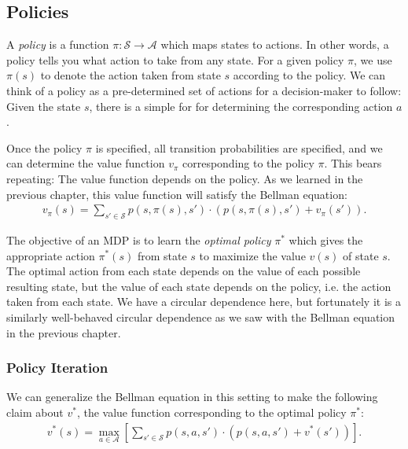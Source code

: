 \documentclass{article}
\begin{document}
    \subsection{\sc Policies}

      A {\it policy} is a function $\pi : \mathcal{S} \rightarrow \mathcal{A}$ which maps states to actions. In other words, a policy tells you what action to take from any state. For a given policy $\pi$, we use $\pi(s)$ to denote the action taken from state $s$ according to the policy. We can think of a policy as a pre-determined set of actions for a decision-maker to follow: Given the state $s$, there is a simple for for determining the corresponding action $a$.

      Once the policy $\pi$ is specified, all transition probabilities are specified, and we can determine the value function $v_\pi$ corresponding to the policy $\pi$. This bears repeating: The value function depends on the policy. As we learned in the previous chapter, this value function will satisfy the Bellman equation:
      \begin{align*}
        v_\pi(s) = \sum_{s' \in \mathcal{S}} p(s, \pi(s), s') \cdot (p(s, \pi(s), s') + v_\pi(s')).
      \end{align*}
      
      The objective of an MDP is to learn the {\it optimal policy} $\pi^*$ which gives the appropriate action $\pi^*(s)$ from state $s$ to maximize the value $v(s)$ of state $s$. The optimal action from each state depends on the value of each possible resulting state, but the value of each state depends on the policy, i.e. the action taken from each state. We have a circular dependence here, but fortunately it is a similarly well-behaved circular dependence as we saw with the Bellman equation in the previous chapter.

      \subsubsection{\sc Policy Iteration}

        We can generalize the Bellman equation in this setting to make the following claim about $v^*$, the value function corresponding to the optimal policy $\pi^*$:
        \begin{align}
          \label{eqn:bellman-equation}
          v^*(s) = \max_{a \in \mathcal{A}} \left[\sum_{s' \in \mathcal{S}} p(s, a, s') \cdot (p(s, a, s') + v^*(s'))\right].
        \end{align}
\end{document}
